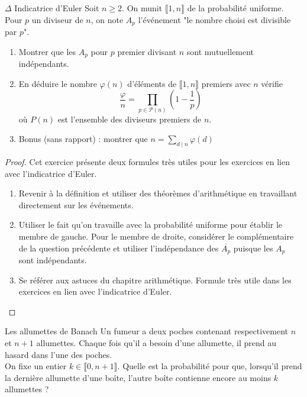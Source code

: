 \documentclass[french,a4paper]{article}
\theoremstyle{plain}
\theoremstyle{definition}
\theoremstyle{remark}
\begin{document}
\begin{ex}{$\Delta$ Indicatrice d'Euler}
	Soit $n\geqslant 2$. On munit $\llbracket 1,n\rrbracket$ de la probabilité uniforme. Pour $p$ un diviseur de $n$, on note $A_p$ l'événement "le nombre choisi est divisible par $p$".
	\begin{enumerate}
		\item Montrer que les $A_p$ pour $p$ premier divisant $n$ sont mutuellement indépendants.
		\item En déduire le nombre $\varphi(n)$ d'éléments de $\llbracket1,n\rrbracket$ premiers avec $n$ vérifie $$\frac{\varphi}{n}=\prod_{p\in\mathcal{P}(n)}\left(1-\frac{1}{p}\right)$$ où $P(n)$ est l'ensemble des diviseurs premiers de $n$.
		\item Bonus (sans rapport) : montrer que $n=\displaystyle\sum_{d\mid n}\varphi(d)$
	\end{enumerate}
\end{ex}
\begin{proof}
	Cet exercice présente deux formules très utiles pour les exercices en lien avec l'indicatrice d'Euler.
	\begin{enumerate}
		\item Revenir à la définition et utiliser des théorèmes d'arithmétique en travaillant directement sur les événements.
		\item Utiliser le fait qu'on travaille avec la probabilité uniforme pour établir le membre de gauche. Pour le membre de droite, considérer le complémentaire de la question précédente et utiliser l'indépendance des $\overline{A_p}$ puisque les $A_p$ sont indépendants.
		\item Se référer aux astuces du chapitre arithmétique. Formule très utile dans les exercices en lien avec l'indicatrice d'Euler.
	\end{enumerate}
\end{proof}

\begin{ex}{Les allumettes de Banach}
	Un fumeur a deux poches contenant respectivement $n$ et $n+1$ allumettes. Chaque fois qu'il a besoin d'une allumette, il prend au hasard dans l'une des poches.\\ On fixe un entier $k\in\llbracket0,n+1\rrbracket$. Quelle est la probabilité pour que, lorsqu'il prend la dernière allumette d'une boîte, l'autre boîte contienne encore au moins $k$ allumettes ?
\end{ex}
\end{document}
